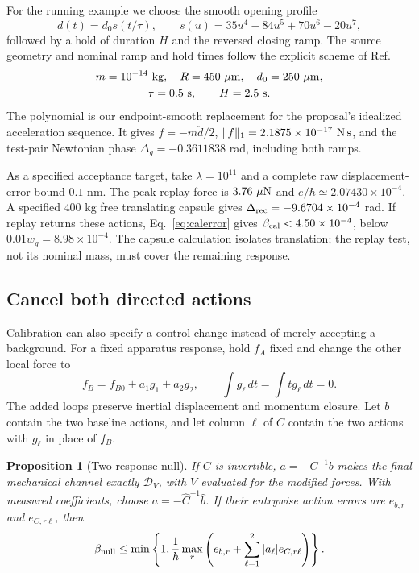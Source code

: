 \documentclass[aps,pra,reprint,amsmath,amssymb,longbibliography,floatfix]{revtex4-2}
\newtheorem{proposition}[theorem]{Proposition}
\newcommand{\norm}[1]{\lVert#1\rVert}
\newcommand{\DV}{\mathcal D_V}
\begin{document}
For the running example we choose the smooth opening profile
\begin{equation}
d(t)=d_0s(t/\tau),\qquad s(u)=35u^4-84u^5+70u^6-20u^7,
\label{eq:pulse}
\end{equation}
followed by a hold of duration $H$ and the reversed closing ramp. The source geometry and nominal ramp and hold times follow the explicit scheme of Ref.~\cite{Bose}
\begin{equation}
\begin{gathered}
m=10^{-14}\ {\rm kg},\quad R=450\ \mu{\rm m},\quad d_0=250\ \mu{\rm m},\\
\tau=0.5\ {\rm s},\qquad H=2.5\ {\rm s}.
\end{gathered}
\label{eq:boseinputs}
\end{equation}
The polynomial is our endpoint-smooth replacement for the proposal's idealized acceleration sequence. It gives $f=-m\ddot d/2$, $\norm f_1=2.1875\times10^{-17}\ {\rm N\,s}$, and the test-pair Newtonian phase $\Delta_g=-0.3611838$ rad, including both ramps.

As a specified acceptance target, take $\lambda=10^{11}$ and a complete raw displacement-error bound $0.1$ nm. The peak replay force is $3.76\ \mu{\rm N}$ and $e/\hbar\simeq2.07430\times10^{-4}$. A specified $400$ kg free translating capsule gives $\Delta_{\rm rec}=-9.6704\times10^{-4}$ rad. If replay returns these actions, Eq.~\eqref{eq:calerror} gives $\beta_{\rm cal}<4.50\times10^{-4}$, below $0.01w_g=8.98\times10^{-4}$. The capsule calculation isolates translation; the replay test, not its nominal mass, must cover the remaining response.

\subsection{Cancel both directed actions}
Calibration can also specify a control change instead of merely accepting a background. For a fixed apparatus response, hold $f_A$ fixed and change the other local force to
\begin{equation}
f_B=f_{B0}+a_1g_1+a_2g_2,\qquad
\int g_\ell\,dt=\int t g_\ell\,dt=0.
\label{eq:loops}
\end{equation}
The added loops preserve inertial displacement and momentum closure. Let $b$ contain the two baseline actions, and let column $\ell$ of $C$ contain the two actions with $g_\ell$ in place of $f_B$.

\begin{proposition}[Two-response null]
If $C$ is invertible, $a=-C^{-1}b$ makes the final mechanical channel exactly $\DV$, with $V$ evaluated for the modified forces. With measured coefficients, choose $a=-\widehat C^{-1}\widehat b$. If their entrywise action errors are $e_{b,r}$ and $e_{C,r\ell}$, then
\begin{equation}
\beta_{\rm null}\le\min\left\{1,\frac1\hbar\max_r\left(e_{b,r}+\sum_{\ell=1}^2|a_\ell|e_{C,r\ell}\right)\right\}.
\label{eq:nullerror}
\end{equation}
\end{proposition}
\end{document}
